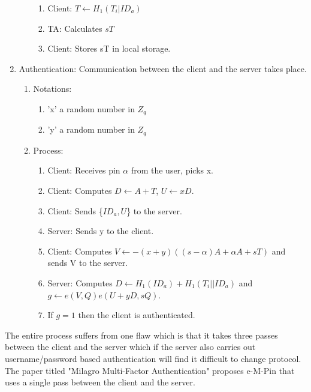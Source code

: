 \documentclass[]{article}   %
\begin{document}
\begin{enumerate}
\begin{enumerate}
\begin{enumerate}
                        \item Client: $T \leftarrow H_1(T_i|ID_a)$
                        \item TA: Calculates $sT$
                        \item Client: Stores sT in local storage.
                    \end{enumerate}
          \end{enumerate}
    \item Authentication: Communication between the client and the server takes place.
          \begin{enumerate}
              \item Notations:
                    \begin{enumerate}
                        \item 'x' a random number in $Z_q$
                        \item 'y' a random number in $Z_q$
                    \end{enumerate}
              \item Process:
                    \begin{enumerate}
                        \item Client: Receives pin $\alpha$ from the user, picks x.
                        \item Client: Computes $D \leftarrow A + T$, $U \leftarrow xD$.
                        \item Client: Sends \{$ID_a, U$\} to the server.
                        \item Server: Sends y to the client.
                        \item Client: Computes $V \leftarrow -(x+y)((s-\alpha)A +\alpha A+sT)$ and sends V to the server.
                        \item Server: Computes $D \leftarrow H_1(ID_a)+H_1(T_i||ID_a)$ and \newline $g \leftarrow e(V,Q)e(U+yD,sQ)$.
                        \item If $g = 1$ then the client is authenticated.
                    \end{enumerate}
          \end{enumerate}
\end{enumerate}
The entire process suffers from one flaw which is that it takes three passes between the client and the server which if the server also carries out username/password based authentication will find it difficult to change protocol. The paper titled "Milagro Multi-Factor Authentication" proposes e-M-Pin that uses a single pass between the client and the server.
\end{document}
